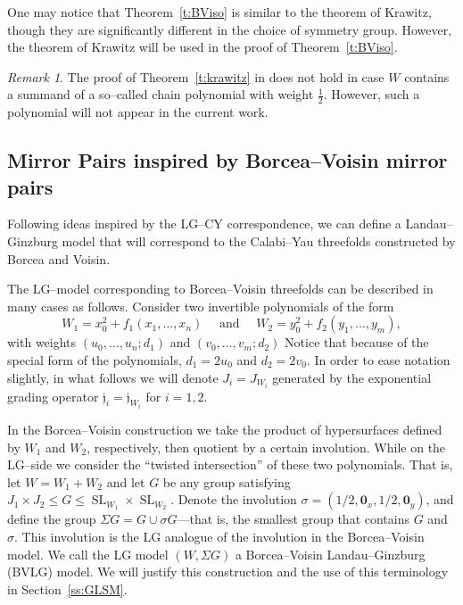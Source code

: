 \documentclass[10pt, letterpaper]{amsart}
\theoremstyle{remark}
\newtheorem{rem}{Remark}[thm]
\newcommand{\jw}{\mathfrak{j}}
\newcommand{\s}[1]{\Sigma #1}
\newcommand{\mb}[1]{\mathbf{#1}}
\DeclareMathOperator{\SL}{SL}
\begin{document}
One may notice that Theorem~\ref{t:BViso} is similar to the theorem of Krawitz, though they are significantly different in the choice of symmetry group. However, the theorem of Krawitz will be used in the proof of Theorem~\ref{t:BViso}.

\begin{rem}
The proof of Theorem~\ref{t:krawitz} in \cite{Kr} does not hold in case $W$ contains a summand of a so--called chain polynomial with weight $\tfrac 12$. However, such a polynomial will not appear in the current work. 
\end{rem}




\subsection{Mirror Pairs inspired by Borcea--Voisin mirror pairs}\label{ss:BVLGmodel}
Following ideas inspired by the LG--CY correspondence, we can define a Landau--Ginzburg model that will correspond to the Calabi--Yau threefolds constructed by Borcea and Voisin. 

The LG--model corresponding to Borcea--Voisin threefolds can be described in many cases as follows. Consider two invertible polynomials of the form 
\begin{equation}\label{e:wxwy}
W_1=x_0^2+f_1(x_1,\dots,x_n)\quad \text{ and }\quad W_2= y_0^2+f_2(y_1,\dots,y_m), 
\end{equation}
with weights $(u_0,\dots, u_n;d_1)$ and $(v_0,\dots,v_m;d_2)$ Notice that because of the special form of the polynomials, $d_1 = 2u_0$ and $d_2 = 2v_0$. In order to ease notation slightly, in what follows we will denote $J_i=J_{W_i}$ generated by the exponential grading operator $\jw_i=\jw_{W_i}$ for $i=1,2$.  
 
In the Borcea--Voisin construction we take the product of hypersurfaces defined by $W_1$ and $W_2$, respectively,  then quotient by a certain involution. While on the LG--side we consider the ``twisted intersection'' of these two polynomials. That is, let $W=W_1+W_2$ and let $G$ be any group satisfying $J_1\times J_2\leq G\leq \SL_{W_1}\times \SL_{W_2}$. Denote the involution 
$\sigma=(1/2,\mb{0}_x,1/2,\mb{0}_y)$, and define the group $\s{G}=G\cup \sigma G$---that is, the smallest group that contains $G$ and $\sigma$. This involution is the LG analogue of the involution in the Borcea--Voisin model. We call the LG model $(W,\s{G})$ a Borcea--Voisin Landau--Ginzburg (BVLG) model. We will justify this construction and the use of this terminology in Section~\ref{ss:GLSM}. 
\end{document}
